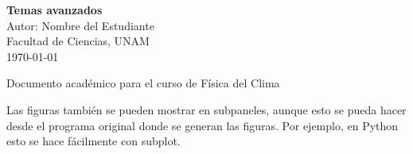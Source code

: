 \documentclass[12pt]{article}
\begin{document}
\begin{titlepage}
    \begin{center}
        \vspace*{2cm} %
        {\Huge\bfseries Temas avanzados}\\[1cm]
        {\Large Autor: Nombre del Estudiante}\\[0.5cm]
        {\large Facultad de Ciencias, UNAM}\\[1cm]
        {\large \today}
    \end{center}
    \vfill %
    \begin{center}
        {\small Documento académico para el curso de Física del Clima}
    \end{center}
\end{titlepage}

Las figuras también se pueden mostrar en subpaneles, aunque esto se pueda hacer desde el programa original donde se generan las figuras. Por ejemplo, en Python esto se hace fácilmente con subplot. 
\end{document}
